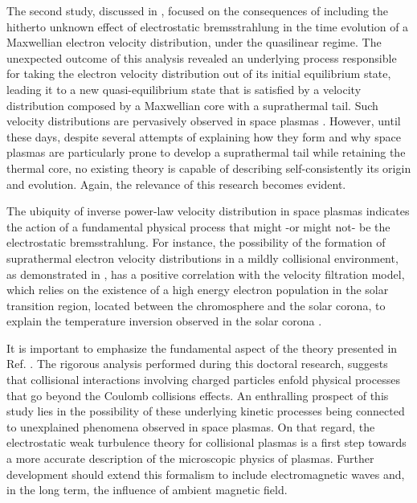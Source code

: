 \documentclass[12pt,a4paper,ruledheader]{report}
\begin{document}
The second study, discussed in , focused on the
consequences of including the hitherto unknown effect of electrostatic
bremsstrahlung in the time evolution of a Maxwellian electron velocity
distribution, under the quasilinear regime. The unexpected outcome of this
analysis revealed an underlying process responsible for taking the electron
velocity distribution out of its initial equilibrium state, leading it to
a new quasi-equilibrium state that is satisfied by a velocity distribution
composed by a Maxwellian core with a suprathermal tail. Such velocity
distributions are pervasively observed in space plasmas \cite{Parker1958a,
  Vasyliunas68,Coroniti1974,FABMG75,Lin1998,Horne2005,Clark2015,Padovani2015,
  deSoria2016,Padovani2017,Deca2017}. However, until these days, despite
several attempts of explaining how they form and why space plasmas are
particularly prone to develop a suprathermal tail while retaining the
thermal core, no existing theory is capable of describing self-consistently
its origin and evolution. Again, the relevance of this research becomes
evident.

The ubiquity of inverse power-law velocity distribution in space plasmas
indicates the action of a fundamental physical process that might -or
might not- be the electrostatic bremsstrahlung. For instance, the possibility
of the formation of suprathermal electron velocity distributions in a mildly
collisional environment, as demonstrated in \cite{Tigik2017a}, has a positive
correlation with the velocity filtration model, which relies on the existence
of a high energy electron population in the solar transition region, located
between the chromosphere and the solar corona, to explain the temperature
inversion observed in the solar corona \cite{Scudder92a,Scudder92b,Anderson94,
  Scudder94,Scudder96,DS99,DS03,Teles15}.

It is important to emphasize the fundamental aspect of the
theory presented in Ref. \cite{YZKS16}. The rigorous analysis performed during
this doctoral research, suggests that collisional interactions involving charged
particles enfold physical processes that go beyond the Coulomb collisions
effects. An enthralling prospect of this study lies in the possibility of these
underlying kinetic processes being connected to unexplained phenomena observed
in space plasmas. On that regard, the electrostatic weak turbulence theory for
collisional plasmas is a first step towards a more accurate description of the
microscopic physics of plasmas. Further development should extend this formalism
to include electromagnetic waves and, in the long term, the influence of ambient
magnetic field. 
\end{document}
